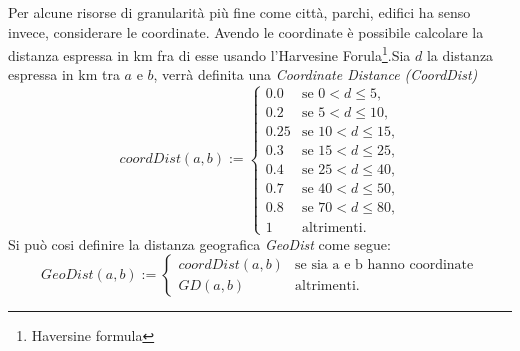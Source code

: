 \documentclass[a4paper,12pt]{report}
\begin{document}
Per alcune risorse di granularità più fine come città, parchi, edifici ha senso invece, considerare le coordinate. Avendo le coordinate è possibile calcolare la distanza espressa in km fra di esse usando l’Harvesine Forula\footnote{Haversine formula}.Sia $d$ la distanza espressa in km tra $a$ e $b$, verrà definita una \emph{Coordinate Distance (CoordDist)} 
\begin{equation}
\label{eq:coordinatedistance}
coordDist(a,b):=\begin{cases}
0.0 & \text{se $0<d\leq5$,}\\
0.2 & \text{se $5<d\leq10$,}\\
0.25 & \text{se $10<d\leq15$,}\\
0.3 & \text{se $15<d\leq25$,}\\
0.4 & \text{se $25<d\leq40$,}\\
0.7 & \text{se $40<d\leq50$,}\\
0.8 & \text{se $70<d\leq80$,}\\
1& \text{altrimenti.}
\end{cases}
\end{equation}
Si può cosi definire la distanza geografica \emph{GeoDist} come segue:
\begin{equation}
\label{eq:geoDistance}
GeoDist(a,b):=\begin{cases}
coordDist(a,b)& \text{se sia a e b hanno coordinate}\\
GD(a,b)&  \text{altrimenti.}
\end{cases}
\end{equation}

\newpage
\end{document}
